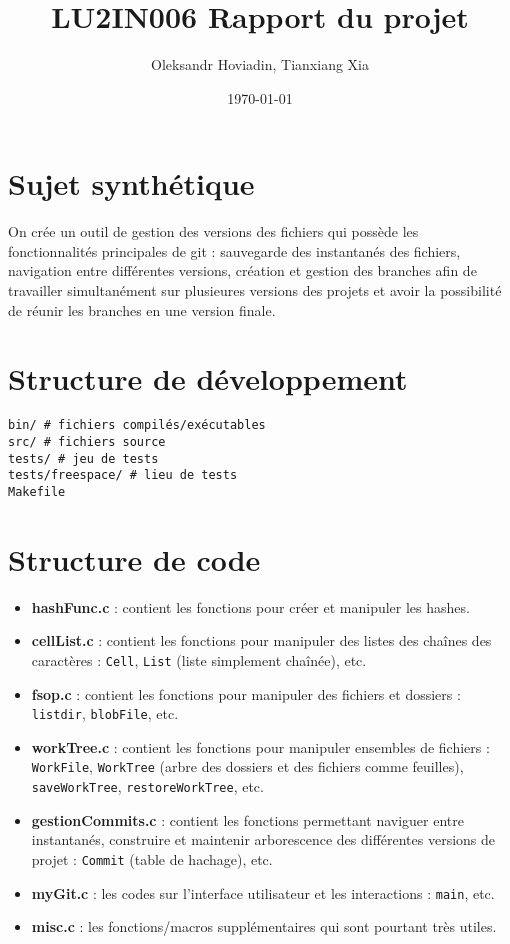 \documentclass{report}
\title{LU2IN006 Rapport du projet}
\author{Oleksandr Hoviadin, Tianxiang Xia}
\date{\today}
\begin{document}
\maketitle
\section*{Sujet synthétique}
On crée un outil de gestion des versions des fichiers
qui possède les fonctionnalités principales de git : sauvegarde des instantanés
des fichiers, navigation entre différentes versions,
création et gestion des branches afin de travailler simultanément
sur plusieures versions des projets et avoir la possibilité de réunir les branches en une version finale.

\section*{Structure de développement}

\begin{verbatim}
bin/ # fichiers compilés/exécutables
src/ # fichiers source
tests/ # jeu de tests
tests/freespace/ # lieu de tests
Makefile
\end{verbatim}

\section*{Structure de code}
\begin{itemize}
    \item \textbf{hashFunc.c} : contient les fonctions pour créer et manipuler les hashes.
    \item \textbf{cellList.c} : contient les fonctions pour manipuler des listes des chaînes des caractères : \verb|Cell|, \verb|List| (liste simplement chaînée), etc.
    \item \textbf{fsop.c} : contient les fonctions pour manipuler des fichiers et dossiers : \verb|listdir|, \verb|blobFile|, etc.
    \item \textbf{workTree.c} : contient les fonctions pour manipuler ensembles de fichiers : \verb|WorkFile|,
    \verb|WorkTree| (arbre des dossiers et des fichiers comme feuilles),
    \verb|saveWorkTree|, \verb|restoreWorkTree|, etc.
    \item \textbf{gestionCommits.c} : contient les fonctions permettant naviguer entre instantanés, construire et maintenir arborescence des différentes versions de projet :
    \verb|Commit| (table de hachage), etc.
    \item\textbf{myGit.c} : les codes sur l'interface utilisateur et les interactions : \verb|main|, etc.
    \item\textbf{misc.c} : les fonctions/macros supplémentaires qui sont pourtant très utiles.
\end{itemize}
\end{document}
